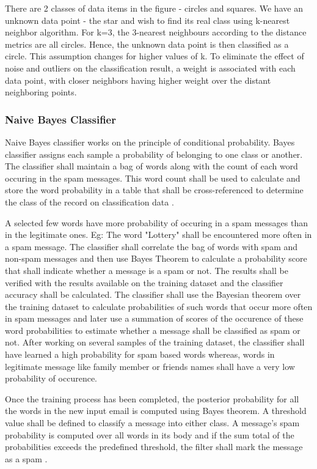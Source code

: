 \documentclass[9pt,twocolumn,twoside]{../../styles/osajnl}
\begin{document}
There are 2 classes of data items in the figure - circles and
squares. We have an unknown data point - the star and wish to find its
real class using k-nearest neighbor algorithm. For k=3, the 3-nearest
neighbours according to the distance metrics are all circles. Hence,
the unknown data point is then classified as a circle. This assumption
changes for higher values of k. To eliminate the effect of noise and
outliers on the classification result, a weight is associated with
each data point, with closer neighbors having higher weight over the
distant neighboring points.

\subsubsection{Naive Bayes Classifier}

Naive Bayes classifier works on the principle of conditional
probability. Bayes classifier assigns each sample a probability of
belonging to one class or another. The classifier shall maintain a bag
of words along with the count of each word occuring in the spam
messages. This word count shall be used to calculate and store the
word probability in a table that shall be cross-referenced to
determine the class of the record on classification data
\cite{paper-classification-of-email}.

A selected few words have more probability of occuring in a spam
messages than in the legitimate ones. Eg: The word "Lottery" shall be
encountered more often in a spam message.  The classifier shall
correlate the bag of words with spam and non-spam messages and then
use Bayes Theorem to calculate a probability score that shall indicate
whether a message is a spam or not. The results shall be verified with
the results available on the training dataset and the classifier
accuracy shall be calculated.  The classifier shall use the Bayesian
theorem over the training dataset to calculate probabilities of such
words that occur more often in spam messages and later use a summation
of scores of the occurence of these word probabilities to estimate
whether a message shall be classified as spam or not. After working on
several samples of the training dataset, the classifier shall have
learned a high probability for spam based words whereas, words in
legitimate message like family member or friends names shall have a
very low probability of occurence.

Once the training process has been completed, the posterior
probability for all the words in the new input email is computed using
Bayes theorem. A threshold value shall be defined to classify a
message into either class. A message's spam probability is computed
over all words in its body and if the sum total of the probabilities
exceeds the predefined threshold, the filter shall mark the message as
a spam \cite{www-wiki-naivebayes}.
\end{document}
